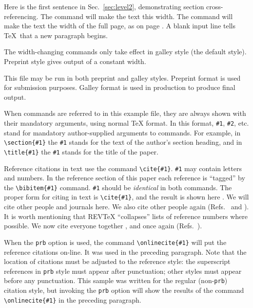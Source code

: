 Here is the first sentence in Sec.\ \ref{sec:level2}, demonstrating
section cross-referencing.
The command 
will make the text this width. The command 
will make the text the width of the full page, as on page \pageref{wideeq}.
A blank input line tells \TeX\ that a new paragraph begins.

The width-changing commands only take effect in galley style (the default
style). Preprint style gives output of a constant width.

This file may be run in both preprint and galley styles. Preprint
format is used for submission purposes. Galley format is used in production
to produce final output.

When commands are referred to in this example file, they are always shown
with their mandatory arguments, using normal \TeX{} format. In this format,
\verb+#1+, \verb+#2+, etc. stand for mandatory
author-supplied arguments to commands.
For example, in
\verb+\section{#1}+ the \verb+#1+ stands for the text of the author's section
heading, and in \verb+\title{#1}+ the \verb+#1+ stands for the
title of the paper.


Reference citations in text use the command \verb+\cite{#1}+.
\verb+#1+ may contain letters and numbers.
In the reference section of this paper
each reference is ``tagged'' by the \verb+\bibitem{#1}+ command.
\verb+#1+ should be {\em identical\/} in both commands.
The proper form for citing in text is
\verb+\cite{#1}+,
and the result is shown here \cite{smith82,jones78}.
We will cite  other people \cite{smith82,jonessmith80}
and journals here. We also cite other people again (Refs.\
 and ).
It is worth mentioning that REV\TeX{} ``collapses'' lists
of reference numbers where possible.  We now cite
everyone together \cite{smith82,jones78,jonessmith80}, and once again
(Refs.\ \onlinecite{smith82,jones78,jonessmith80}).

When the {\tt prb} option is used, the command \verb+\onlinecite{#1}+ will
put the reference citations on-line. It was used in the preceding paragraph.
Note that the location of citations must be adjusted to the reference style:
the superscript references in {\tt prb} style must appear after punctuation;
other styles must appear before any punctuation. This sample was written
for the regular (non-{\tt prb}) citation style, but invoking the
{\tt prb} option will show the results of  the command \verb+\onlinecite{#1}+
in the preceding paragraph.



